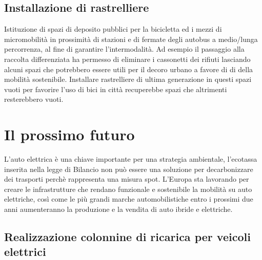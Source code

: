 \documentclass[a4paper,14pt,italian]{sphinxmanual}
\begin{document}
\subsection{Installazione di rastrelliere}
\label{\detokenize{mobilita:installazione-di-rastrelliere}}
Istituzione di spazi di deposito pubblici per la bicicletta ed i mezzi di micromobilità in prossimità di stazioni e di fermate degli autobus a medio/lunga percorrenza, al fine di garantire l’intermodalità.
Ad esempio il passaggio alla raccolta differenziata ha permesso di eliminare i cassonetti dei rifiuti lasciando alcuni spazi che potrebbero essere utili per il decoro urbano a favore di di della mobilità sostenibile.
Installare rastrelliere di ultima generazione in questi spazi vuoti per favorire l’uso di bici in città recuperebbe spazi che altrimenti resterebbero vuoti.






\section{Il prossimo futuro}
\label{\detokenize{mobilita:il-prossimo-futuro}}
L’auto elettrica è una chiave importante per una strategia ambientale, l’ecotassa inserita nella legge di Bilancio non può essere una soluzione per decarbonizzare dei trasporti perchè rappresenta una misura spot.
L’Europa sta lavorando per creare le infrastrutture che rendano funzionale e sostenibile la mobilità su auto elettriche, così come le più grandi marche automobilistiche entro i prossimi due anni aumenteranno la produzione e la vendita di auto ibride e elettriche.


\subsection{Realizzazione colonnine di ricarica per veicoli elettrici}
\label{\detokenize{mobilita:realizzazione-colonnine-di-ricarica-per-veicoli-elettrici}}
\end{document}
